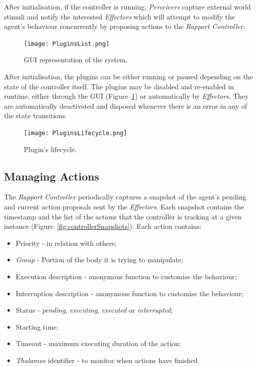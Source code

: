 After initialisation, if the controller is running, \textit{Perceivers} capture external world stimuli and notify the interested \textit{Effectors} which will attempt to modify the agent's behaviour concurrently by proposing actions to the \textit{Rapport Controller}. 

\begin{figure}[H]
	\centering
	\texttt{[image: PluginsList.png]}
	\caption{\ac{GUI} representation of the system.}
	\label{fig:pluginList}
\end{figure}

After initialisation, the plugins can be either running or paused depending on the state of the controller itself. The plugins may be disabled and re-enabled in runtime, either through the \ac{GUI} (Figure~\ref{fig:pluginList}) or automatically by \textit{Effectors}. They are automatically deactivated and disposed whenever there is an error in any of the state transitions.

\begin{figure}[H]
	\centering
	\texttt{[image: PluginsLifecycle.png]}
	\caption{Plugin's lifecycle.}
	\label{fig:pluginLifecycle}
\end{figure}

\subsection{Managing Actions}
\label{sub:sec:managingActions}

The \textit{Rapport Controller} periodically captures a snapshot of the agent's pending and current action proposals sent by the \textit{Effectors}. Each snapshot contains the timestamp and the list of the actions that the controller is tracking at a given instance (Figure~\ref{fig:controllerSnapshots}). Each action contains:
\begin{itemize}
	\item Priority - in relation with others;
	\item \textit{Group} - Portion of the body it is trying to manipulate;
	\item Execution description - anonymous function to customise the behaviour;
	\item Interruption description - anonymous function to customise the behaviour;
	\item Status - \textit{pending}, \textit{executing}, \textit{executed} or \textit{interrupted};
	\item Starting time;
	\item Timeout - maximum executing duration of the action;
	\item \textit{Thalamus} identifier - to monitor when actions have finished.
\end{itemize}

